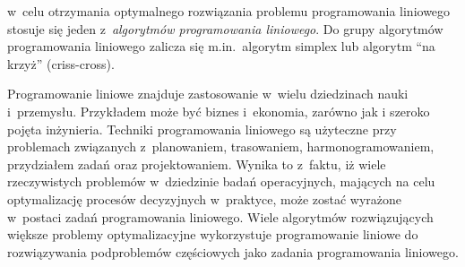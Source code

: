 \par{
  w~celu otrzymania optymalnego rozwiązania problemu programowania liniowego
  stosuje się jeden z~\emph{algorytmów programowania liniowego}.
  Do grupy algorytmów programowania liniowego zalicza się m.in.\ algorytm
  simplex lub algorytm ``na krzyż'' (criss-cross).
}
\par{
  Programowanie liniowe znajduje zastosowanie w~wielu dziedzinach nauki i~przemysłu. 
  Przykładem może być biznes i~ekonomia, zarówno jak i szeroko pojęta inżynieria.
  Techniki programowania liniowego są użyteczne przy problemach związanych 
  z~planowaniem, trasowaniem, harmonogramowaniem, przydziałem zadań oraz
  projektowaniem.
  Wynika to z~faktu, iż wiele rzeczywistych problemów w~dziedzinie badań
  operacyjnych, mających na celu optymalizację procesów decyzyjnych w~praktyce,
  może zostać wyrażone w~postaci zadań programowania liniowego.
  Wiele algorytmów rozwiązujących większe problemy optymalizacyjne wykorzystuje
  programowanie liniowe do rozwiązywania podproblemów częściowych jako zadania 
  programowania liniowego.
}
